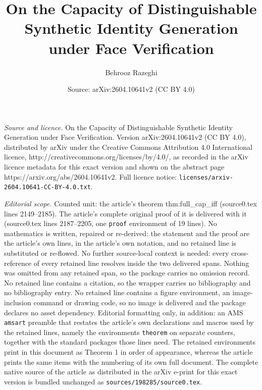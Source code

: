 \documentclass[10pt,a4paper]{amsart}
\title{On the Capacity of Distinguishable Synthetic Identity Generation under Face Verification}
\author{Behrooz Razeghi}
\date{Source: arXiv:2604.10641v2 (CC BY 4.0)}
\begin{document}
\maketitle

\noindent\emph{Source and licence.} On the Capacity of Distinguishable Synthetic Identity Generation under Face Verification. Version arXiv:2604.10641v2 (CC BY 4.0), distributed by arXiv under the Creative Commons Attribution 4.0 International licence, http://creativecommons.org/licenses/by/4.0/, as recorded in the arXiv licence metadata for this exact version and shown on the abstract page https://arxiv.org/abs/2604.10641v2. Full licence notice: \texttt{licenses/arxiv-2604.10641-CC-BY-4.0.txt}.\par\smallskip

\noindent\textit{Editorial scope.} Counted unit: the article's theorem thm:full\_cap\_iff (source0.tex lines 2149--2185). The article's complete original proof of it is delivered with it (source0.tex lines 2187--2205, one \texttt{proof} environment of 19 lines). No mathematics is written, repaired or re-derived: the statement and the proof are the article's own lines, in the article's own notation, and no retained line is substituted or re-flowed.  No further source-local context is needed: every cross-reference of every retained line resolves inside the two delivered spans.  Nothing was omitted from any retained span, so the package carries no omission record.  No retained line contains a citation, so the wrapper carries no bibliography and no bibliography entry.  No retained line contains a figure environment, an image-inclusion command or drawing code, so no image is delivered and the package declares no asset dependency.  Editorial formatting only, in addition: an AMS \texttt{amsart} preamble that restates the article's own declarations and macros used by the retained lines, namely the environments \texttt{theorem} on separate counters, together with the standard packages those lines need.  The retained environments print in this document as Theorem 1 in order of appearance, whereas the article prints the same items with the numbering of its own full document.  The complete native source of the article as distributed in the arXiv e-print for this exact version is bundled unchanged as \texttt{sources/198285/source0.tex}.
\end{document}
